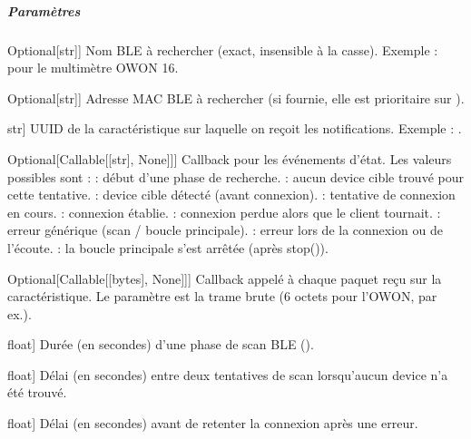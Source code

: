 \documentclass[letterpaper,10pt,french]{sphinxmanual}
\begin{document}
\begin{fulllineitems}
\subparagraph{Paramètres}
\label{\detokenize{api/hardware.transports:parametres}}\begin{description}
\sphinxlineitem{name\_filter}{[}Optional{[}str{]}{]}
\sphinxAtStartPar
Nom BLE à rechercher (exact, insensible à la casse).
Exemple :  pour le multimètre OWON 16.

\sphinxlineitem{address\_filter}{[}Optional{[}str{]}{]}
\sphinxAtStartPar
Adresse MAC BLE à rechercher (si fournie, elle est prioritaire
sur ).

\sphinxlineitem{characteristic\_uuid}{[}str{]}
\sphinxAtStartPar
UUID de la caractéristique sur laquelle on reçoit les notifications.
Exemple : .

\sphinxlineitem{on\_status}{[}Optional{[}Callable{[}{[}str{]}, None{]}{]}{]}
\sphinxAtStartPar
Callback pour les événements d’état. Les valeurs possibles sont :
\sphinxhyphen{}   : début d’une phase de recherche.
\sphinxhyphen{}      : aucun device cible trouvé pour cette tentative.
\sphinxhyphen{}          : device cible détecté (avant connexion).
\sphinxhyphen{}     : tentative de connexion en cours.
\sphinxhyphen{}      : connexion établie.
\sphinxhyphen{}   : connexion perdue alors que le client tournait.
\sphinxhyphen{}          : erreur générique (scan / boucle principale).
\sphinxhyphen{}  : erreur lors de la connexion ou de l’écoute.
\sphinxhyphen{}        : la boucle principale s’est arrêtée (après stop()).

\sphinxlineitem{on\_packet}{[}Optional{[}Callable{[}{[}bytes{]}, None{]}{]}{]}
\sphinxAtStartPar
Callback appelé à chaque paquet reçu sur la caractéristique.
Le paramètre est la trame brute  (6 octets pour l’OWON, par ex.).

\sphinxlineitem{scan\_timeout}{[}float{]}
\sphinxAtStartPar
Durée (en secondes) d’une phase de scan BLE ().

\sphinxlineitem{retry\_delay}{[}float{]}
\sphinxAtStartPar
Délai (en secondes) entre deux tentatives de scan lorsqu’aucun device
n’a été trouvé.

\sphinxlineitem{reconnect\_delay}{[}float{]}
\sphinxAtStartPar
Délai (en secondes) avant de retenter la connexion après une erreur.


\end{description}
\end{fulllineitems}
\end{document}
